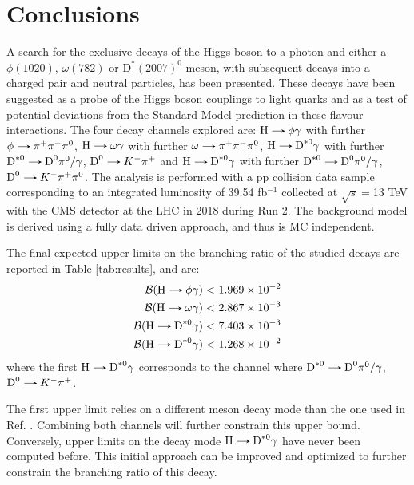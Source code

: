 \chapter*{Conclusions}\label{chap:conclusions}

A search for the exclusive decays of the Higgs boson to a photon and either a $\phi(1020)$, $\omega(782)$ or $\text{D}^{*}(2007)^{0}$ meson, with subsequent decays into a charged pair and neutral particles, has been presented. These decays have been suggested as a probe of the Higgs boson couplings to light quarks and as a test of potential deviations from the Standard Model prediction in these flavour interactions. The four decay channels explored are: $\text{H}\decaysto \phi\gamma$ with further $\phi\decaysto \pi^+\pi^-\pi^0$, $\text{H}\decaysto \omega\gamma$ with further $\omega\decaysto \pi^+\pi^-\pi^0$, $\text{H}\decaysto \text{D}^{*0}\gamma$ with further $\text{D}^{*0}\decaysto \text{D}^{0}\pi^{0}/\gamma$, $\text{D}^{0}\decaysto K^{-}\pi^{+}$ and $\text{H}\decaysto \text{D}^{*0}\gamma$ with further $\text{D}^{*0}\decaysto \text{D}^{0}\pi^{0}/\gamma$, $\text{D}^{0}\decaysto K^{-}\pi^{+}\pi^{0}$. The analysis is performed with a pp collision data sample corresponding to an integrated luminosity of 39.54 fb$^{-1}$ collected at $\sqrt{s}=$13 TeV with the CMS detector at the LHC in 2018 during Run 2. The background model is derived using a fully data driven approach, and thus is MC independent.

The final expected upper limits on the branching ratio of the studied decays are reported in Table \ref{tab:results}, and are:
\begin{equation*}
    \begin{aligned}
        \mathcal{B}(\text{H}\decaysto \phi\gamma) <&\ 1.969 \times 10^{-2}\\
        \mathcal{B}(\text{H}\decaysto \omega\gamma) <&\ 2.867 \times 10^{-3}\\
        \mathcal{B}(\text{H}\decaysto\text{D}^{*0}\gamma) <&\ 7.403 \times 10^{-3}\\
        \mathcal{B}(\text{H}\decaysto\text{D}^{*0}\gamma) <&\ 1.268 \times 10^{-2}\\
\end{aligned}
\end{equation*}
where the first $\text{H}\decaysto\text{D}^{*0}\gamma$ corresponds to the channel where $\text{D}^{*0}\decaysto \text{D}^{0}\pi^{0}/\gamma$, $\text{D}^{0}\decaysto K^{-}\pi^{+}$.

The first upper limit relies on a different meson decay mode than the one used in Ref. \cite{ATLAS:2017gko}. Combining both channels will further constrain this upper bound. Conversely, upper limits on the decay mode $\text{H}\decaysto\text{D}^{*0}\gamma$ have never been computed before. This initial approach can be improved and optimized to further constrain the branching ratio of this decay.

